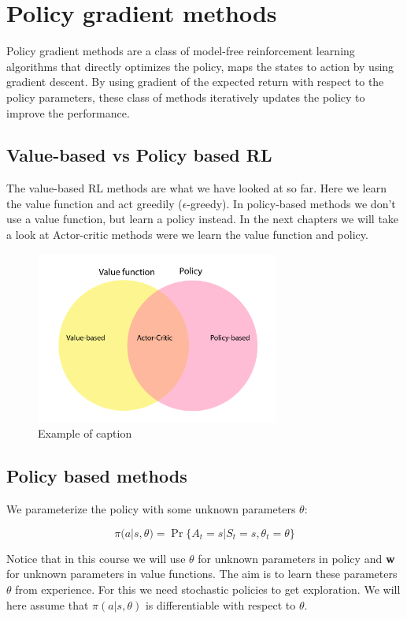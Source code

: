 
\section{Policy gradient methods}
Policy gradient methods are a class of model-free reinforcement learning algorithms that directly optimizes the policy, maps the states to action by using gradient descent. By using gradient of the expected return with respect to the policy parameters, these class of methods iteratively updates the policy to improve the performance. 

\subsection*{Value-based vs Policy based RL}
The value-based RL methods are what we have looked at so far. Here we learn the value function and act greedily ($\epsilon$-greedy). In policy-based methods we don't use a value function, but learn a policy instead. In the next chapters we will take a look at Actor-critic methods were we learn the value function and policy.

\begin{figure}[ht!]
\centering
\includegraphics[width=80mm]{figures/valuepolicy.pdf}
\caption{Example of caption}
\label{fig:example}
\end{figure}


\subsection*{Policy based methods}
We parameterize the policy with some unknown parameters $\theta$:

	\begin{equation}
	 	\pi (a|s, \theta) = \Pr \{A_t = s | S_t = s, \theta_t = \theta \}
	 \end{equation} 

Notice that in this course we will use $\theta$ for unknown parameters in policy and \textbf{w} for unknown parameters in value functions. The aim is to learn these parameters $\theta$ from experience. For this we need stochastic policies to get exploration. We will here assume that $\pi (a|s,\theta)$ is differentiable with respect to $\theta$. 


